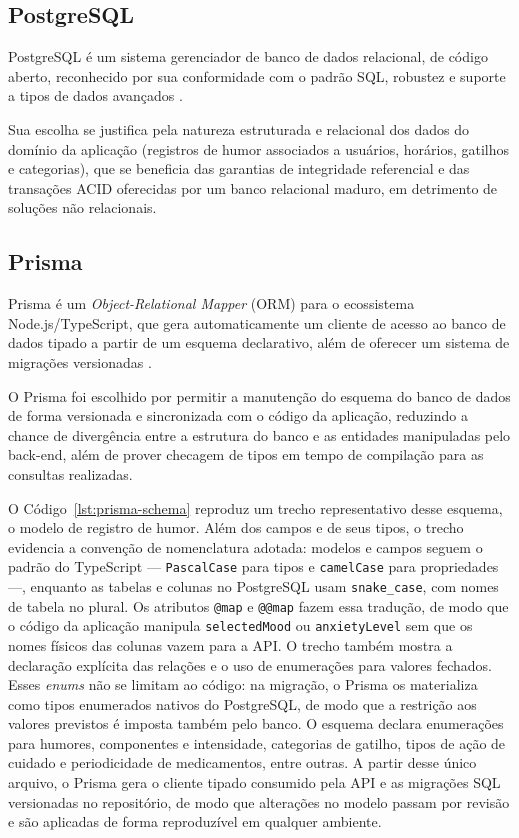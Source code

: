 \subsection{PostgreSQL}

PostgreSQL é um sistema gerenciador de banco de dados relacional, de código
aberto, reconhecido por sua conformidade com o padrão SQL, robustez e suporte
a tipos de dados avançados \citep{postgresql:2026}.

Sua escolha se justifica pela natureza estruturada e relacional dos dados do
domínio da aplicação (registros de humor associados a usuários, horários,
gatilhos e categorias), que se beneficia das garantias de integridade
referencial e das transações ACID oferecidas por um banco relacional
maduro, em detrimento de soluções não relacionais.

\subsection{Prisma}

Prisma é um \textit{Object-Relational Mapper} (ORM) para o ecossistema
Node.js/TypeScript, que gera automaticamente um cliente de acesso ao banco de
dados tipado a partir de um esquema declarativo, além de oferecer um sistema
de migrações versionadas \citep{prisma:2026}.

O Prisma foi escolhido por permitir a manutenção do esquema do banco de dados
de forma versionada e sincronizada com o código da aplicação, reduzindo a
chance de divergência entre a estrutura do banco e as entidades manipuladas
pelo back-end, além de prover checagem de tipos em tempo de compilação para
as consultas realizadas.

O Código~\ref{lst:prisma-schema} reproduz um trecho representativo desse
esquema, o modelo de registro de humor. Além dos campos e de seus tipos, o
trecho evidencia a convenção de nomenclatura adotada: modelos e campos seguem o
padrão do TypeScript --- \texttt{PascalCase} para tipos e \texttt{camelCase}
para propriedades ---, enquanto as tabelas e colunas no PostgreSQL usam
\texttt{snake\_case}, com nomes de tabela no plural. Os atributos
\texttt{@map} e \texttt{@@map} fazem essa tradução, de modo que o código da
aplicação manipula \texttt{selectedMood} ou \texttt{anxietyLevel} sem que os
nomes físicos das colunas vazem para a API. O trecho também mostra a declaração
explícita das relações e o uso de enumerações para valores fechados. Esses
\textit{enums} não se limitam ao código: na migração, o Prisma os materializa
como tipos enumerados nativos do PostgreSQL, de modo que a restrição aos
valores previstos é imposta também pelo banco. O esquema declara enumerações
para humores, componentes e intensidade, categorias de gatilho, tipos de ação
de cuidado e periodicidade de medicamentos, entre outras. A partir desse único
arquivo, o Prisma gera o cliente tipado consumido pela API e as migrações SQL
versionadas no repositório, de modo que alterações no modelo passam por revisão
e são aplicadas de forma reproduzível em qualquer ambiente.

